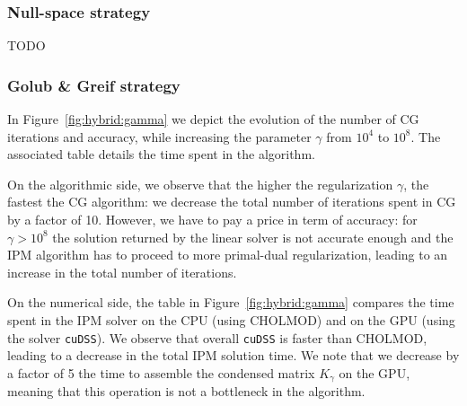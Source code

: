 \begin{table}[!ht]
  \centering
  \caption{Comparing the performance of cuDSS with CHOLMOD.
    The matrix $K_\gamma$ is symmetric positive definite, with
    a size $n = 85,568$. The matrix is super sparse: the number of nonzeroes is $1,057,200$ ($0.01$\%).
    \label{tab:linsol:time}
  }
\end{table}





\subsubsection{Null-space strategy}
TODO

\subsubsection{Golub \& Greif strategy}
In Figure~\ref{fig:hybrid:gamma} we depict the evolution of the number
of CG iterations and accuracy, while increasing the parameter $\gamma$
from $10^4$ to $10^8$. The associated table details the time spent
in the algorithm.

On the algorithmic side, we observe that the higher the regularization $\gamma$,
the fastest the CG algorithm: we decrease the total number of iterations
spent in CG by a factor of 10. However, we have to pay a price in term
of accuracy: for $\gamma > 10^8$ the solution returned by the linear solver
is not accurate enough and the IPM algorithm has to proceed to more
primal-dual regularization, leading to an increase in the total number of iterations.

On the numerical side, the table in Figure~\ref{fig:hybrid:gamma} compares
the time spent in the IPM solver on the CPU (using CHOLMOD) and on the GPU
(using the solver {\tt cuDSS}). We observe that overall {\tt cuDSS} is
faster than CHOLMOD, leading to a decrease in the total IPM solution time.
We note that we decrease by a factor of 5 the time to assemble the condensed
matrix $K_\gamma$ on the GPU, meaning that this operation is not a bottleneck in
the algorithm.

